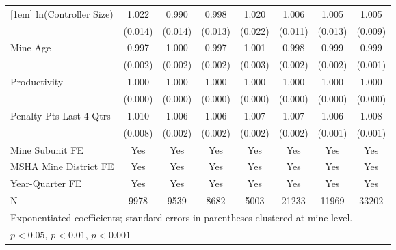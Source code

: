 {\begin{tabular}{l*{7}{c}}
[1em]
ln(Controller Size)      &       1.022         &       0.990         &       0.998         &       1.020         &       1.006         &       1.005         &       1.005         \\
                         &     (0.014)         &     (0.014)         &     (0.013)         &     (0.022)         &     (0.011)         &     (0.013)         &     (0.009)         \\
[1em]
Mine Age                 &       0.997         &       1.000         &       0.997         &       1.001         &       0.998         &       0.999         &       0.999         \\
                         &     (0.002)         &     (0.002)         &     (0.002)         &     (0.003)         &     (0.002)         &     (0.002)         &     (0.001)         \\
[1em]
Productivity             &       1.000\sym{*}  &       1.000\sym{*}  &       1.000         &       1.000         &       1.000\sym{**} &       1.000         &       1.000         \\
                         &     (0.000)         &     (0.000)         &     (0.000)         &     (0.000)         &     (0.000)         &     (0.000)         &     (0.000)         \\
[1em]
Penalty Pts Last 4 Qtrs  &       1.010         &       1.006\sym{***}&       1.006\sym{***}&       1.007\sym{***}&       1.007\sym{***}&       1.006\sym{***}&       1.008\sym{***}\\
                         &     (0.008)         &     (0.002)         &     (0.002)         &     (0.002)         &     (0.002)         &     (0.001)         &     (0.001)         \\
[1em]
Mine Subunit FE          &         Yes         &         Yes         &         Yes         &         Yes         &         Yes         &         Yes         &         Yes         \\
[1em]
MSHA Mine District FE    &         Yes         &         Yes         &         Yes         &         Yes         &         Yes         &         Yes         &         Yes         \\
[1em]
Year-Quarter FE          &         Yes         &         Yes         &         Yes         &         Yes         &         Yes         &         Yes         &         Yes         \\
\hline
N                        &        9978         &        9539         &        8682         &        5003         &       21233         &       11969         &       33202         \\
\hline\hline
\multicolumn{8}{l}{\footnotesize Exponentiated coefficients; standard errors in parentheses clustered at mine level.}\\
\multicolumn{8}{l}{\footnotesize \sym{*} \(p<0.05\), \sym{**} \(p<0.01\), \sym{***} \(p<0.001\)}\\
\end{tabular}
}
